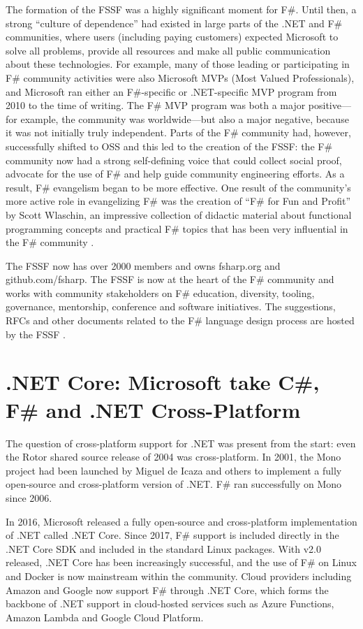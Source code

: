\documentclass[acmsmall,screen]{acmart}
\begin{document}
The formation of the FSSF was a highly significant moment for F\#.  Until then, a strong “culture of dependence” had existed in
large parts of the .NET and F\# communities, where users (including paying customers) expected Microsoft to solve all problems, provide all
resources and make all public communication about these technologies.  For example, many of those leading or participating
in F\# community activities were also Microsoft MVPs (Most Valued Professionals), and Microsoft ran either an F\#-specific or
.NET-specific MVP program from 2010 to the time of writing.  The F\# MVP program was both a major positive---for example, the
community was worldwide---but also a major negative, because it was not initially truly independent.
Parts of the F\# community had, however, successfully shifted to OSS and this led to the creation of the FSSF:
the F\# community now had a strong self-defining voice that could collect social proof, advocate for
the use of F\# and help guide community engineering efforts. As a result, F\# evangelism began to be more effective. One result of
the community’s more active role in evangelizing F\# was the creation of “F\# for Fun and Profit” by Scott Wlaschin, an impressive
collection of didactic material about functional programming concepts and practical F\# topics that has been very influential
in the F\# community \citep{RefFunAndProfit}.


The FSSF now has over 2000 members and owns fsharp.org and github.com/fsharp. The FSSF is now at the heart of the F\# community
and works with community stakeholders on F\# education, diversity, tooling, governance, mentorship, conference and software
initiatives.  The suggestions, RFCs and other documents related to the F\# language design process are hosted by the
FSSF \citep{RefRFCs, RefLangSuggestions}.

\section*{.NET Core: Microsoft take C\#, F\# and .NET Cross-Platform}

The question of cross-platform support for .NET was present from the start: even the Rotor shared source release of 2004 was
cross-platform.  In 2001, the Mono project had been launched by Miguel de Icaza \cite{RefMono} and others to implement a fully open-source and
cross-platform version of .NET. F\# ran successfully on Mono since 2006.  

In 2016, Microsoft released a fully open-source and cross-platform implementation of .NET called .NET Core.  Since 2017, F\# support
is included directly in the .NET Core SDK and included in the standard Linux packages. With v2.0 released, .NET Core has been
increasingly successful, and the use of F\# on Linux and Docker is now mainstream within the community.  Cloud providers including
Amazon and Google now support F\# through .NET Core, which forms the backbone of .NET support in cloud-hosted services
such as Azure Functions, Amazon Lambda and Google Cloud Platform.
\end{document}
